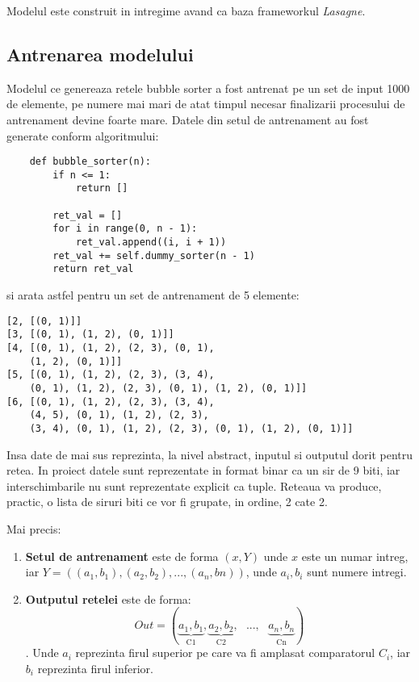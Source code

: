 \documentclass[12pt]{article}
\begin{document}
Modelul este construit in intregime avand ca baza frameworkul \textit{Lasagne}.

\subsection{Antrenarea modelului}

Modelul ce genereaza retele bubble sorter a fost antrenat pe un set de input 1000 de elemente, pe numere mai mari de atat timpul necesar finalizarii procesului de antrenament devine foarte mare. Datele din setul de antrenament au fost generate conform algoritmului:
\begin{lstlisting}
    def bubble_sorter(n):
        if n <= 1:
            return []

        ret_val = []
        for i in range(0, n - 1):
            ret_val.append((i, i + 1))
        ret_val += self.dummy_sorter(n - 1)
        return ret_val
\end{lstlisting}

si arata astfel pentru un set de antrenament de 5 elemente:

\begin{lstlisting}
[2, [(0, 1)]]
[3, [(0, 1), (1, 2), (0, 1)]]
[4, [(0, 1), (1, 2), (2, 3), (0, 1), 
	(1, 2), (0, 1)]]
[5, [(0, 1), (1, 2), (2, 3), (3, 4), 
	(0, 1), (1, 2), (2, 3), (0, 1), (1, 2), (0, 1)]]
[6, [(0, 1), (1, 2), (2, 3), (3, 4), 
	(4, 5), (0, 1), (1, 2), (2, 3), 
	(3, 4), (0, 1), (1, 2), (2, 3), (0, 1), (1, 2), (0, 1)]]
\end{lstlisting}

Insa date de mai sus reprezinta, la nivel abstract, inputul si outputul dorit pentru retea. In proiect datele sunt reprezentate in format binar ca un sir de 9 biti, iar interschimbarile nu sunt reprezentate explicit ca tuple. Reteaua va produce, practic, o lista de siruri biti ce vor fi grupate, in ordine, 2 cate 2. 

Mai precis:
\begin{enumerate}
	\item \textbf{Setul de antrenament} este de forma $(x, Y)$ unde $x$ este un numar intreg, iar 
	$Y=((a_1, b_1), (a_2, b_2), ..., (a_n, bn))$, unde $a_i, b_i$ sunt numere intregi.
	\item \textbf{Outputul retelei} este de forma:
	$$Out=(\underbrace{a_1, b_1}_{\text{C1}}, \underbrace{a_2, b_2}_{\text{C2}},\ \ \  ..., \ \ \  \underbrace{a_n, b_n}_{\text{Cn}})$$.
	Unde $a_i$ reprezinta firul superior pe care va fi amplasat comparatorul $C_i$, iar $b_i$ reprezinta firul inferior. 
\end{enumerate}
\end{document}
